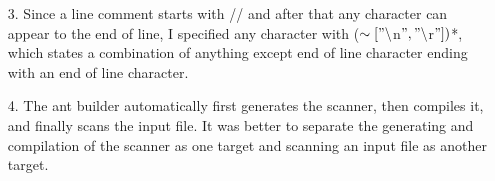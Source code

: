 \documentclass[12pt]{article}
\newcommand{\code}[1]{\textsf{#1}}
\begin{document}
\begin{itemize}
\begin{itemize}
		\end{itemize}
	\item[3.] Since a line comment starts with \code{//} and after that any 
	character can appear to the end of line, I specified any character with 
	\code{($\sim["\backslash $n$","\backslash $r$"])$*}, which states a 
	combination of anything except end of line character ending with an end of 
	line character.
	\item[4.] The \code{ant} builder automatically first generates the scanner, then compiles it, and finally scans the input file. It was better to separate the generating and compilation of the scanner as one target and scanning an input file as another target. 
\end{itemize}
\end{document}
